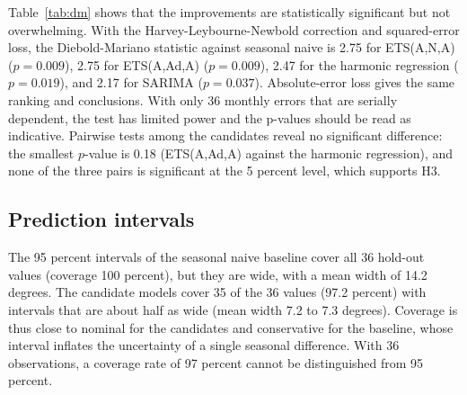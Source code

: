 

Table~\ref{tab:dm} shows that the improvements are statistically significant but not overwhelming. With the Harvey-Leybourne-Newbold correction and squared-error loss, the Diebold-Mariano statistic against seasonal naive is 2.75 for ETS(A,N,A) ($p=0.009$), 2.75 for ETS(A,Ad,A) ($p=0.009$), 2.47 for the harmonic regression ($p=0.019$), and 2.17 for SARIMA ($p=0.037$).
Absolute-error loss gives the same ranking and conclusions. With only 36 monthly errors that are serially dependent, the test has limited power and the p-values should be read as indicative. Pairwise tests among the candidates reveal no significant difference: the smallest $p$-value is 0.18 (ETS(A,Ad,A) against the harmonic regression), and none of the three pairs is significant at the 5 percent level, which supports H3.



\subsection{Prediction intervals}

The 95 percent intervals of the seasonal naive baseline cover all 36 hold-out values (coverage 100 percent), but they are wide, with a mean width of 14.2 degrees.
The candidate models cover 35 of the 36 values (97.2 percent) with intervals that are about half as wide (mean width 7.2 to 7.3 degrees).
Coverage is thus close to nominal for the candidates and conservative for the baseline, whose interval inflates the uncertainty of a single seasonal difference. With 36 observations, a coverage rate of 97 percent cannot be distinguished from 95 percent.

